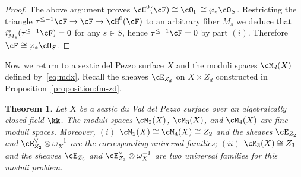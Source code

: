 \documentclass[11pt]{amsart}
\theoremstyle{plain}
\newtheorem{theorem}{Theorem}[section]
\theoremstyle{definition}
\theoremstyle{remark}
\begin{document}
\begin{proof}
The above argument proves $\cH^0(\cF) \cong \cO_\Gamma \cong \varphi_*\cO_S$.
Restricting the triangle $\tau^{\le -1}\cF \to \cF \to \cH^0(\cF)$ to an arbitrary fiber $M_s$ we deduce that $i_{M_s}^*(\tau^{\le -1}\cF) = 0$ for any $s \in S$, hence $\tau^{\le -1}\cF = 0$ by part $(i)$.
Therefore $\cF \cong \varphi_*\cO_S$.
\end{proof}

Now we return to a sextic del Pezzo surface $X$ and the moduli spaces $\cM_d(X)$ defined by~\eqref{eq:mdx}.
Recall the sheaves $\cE_{Z_d}$ on $X \times Z_d$ constructed in Proposition~\ref{proposition:fm-zd}.

\begin{theorem}
\label{theorem:moduli}
Let $X$ be a sextic du Val del Pezzo surface over an algebraically closed field $\kk$. 
The moduli spaces $\cM_2(X)$, $\cM_3(X)$, and $\cM_4(X)$ are fine moduli spaces. 
Moreover,
\newline$(i)$
$\cM_2(X) \cong \cM_4(X) \cong Z_2$ and the sheaves $\cE_{Z_2}$ and $\cE_{Z_2}^\vee \otimes \omega_X^{-1}$ are the corresponding universal families;
\newline$(ii)$
$\cM_3(X) \cong Z_3$ and the sheaves $\cE_{Z_3}$ and $\cE_{Z_3}^\vee \otimes \omega_X^{-1}$ are two universal families for this moduli problem.
\end{theorem}
\end{document}
